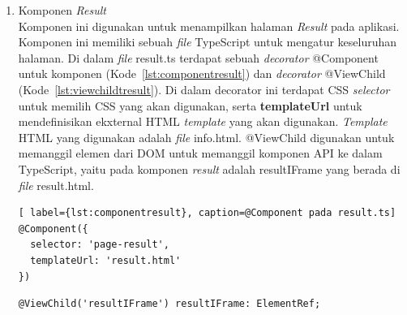 \begin{enumerate}
\begin{itemize}
		\item \textit{Content} \\
		\textit{Content} pada halaman info memiliki \textit{tag} \texttt{<ion-content>} (Kode~\ref{lst:contentInfo}) yang pada gambar~\ref{fig:InfoPageWireframe} dengan kotak berwarna merah. Di dalam \textit{tag} info terdapat \textit{tag} \texttt{<ion-grid>} untuk mengatur \textit{layout} dari \textit{content}. Di dalam \textit{tag} \texttt{<ion-grid>} terdapat sebuah \textit{tag} \texttt{<ion-row>} yang berisi sebuah \textit{tag} \texttt{<div>}. \textit{Tag} tersebut berisi info yang di dapatkan pada \textit{constructor} di \textit{file} info.ts.

\begin{lstlisting}[label={lst:contentInfo}, caption=\textit{Content} pada info.html]
<ion-content>
  <ion-grid>
    <ion-row>
      <div [innerHTML]=wsdcInfoData>
      </div>
    </ion-row>
  </ion-grid>
</ion-content>
\end{lstlisting} 
	\end{itemize}
	
	\item Komponen \textit{Result} \\
	Komponen ini digunakan untuk menampilkan halaman \textit{Result} pada aplikasi. Komponen ini memiliki sebuah \textit{file} TypeScript untuk mengatur keseluruhan halaman. Di dalam \textit{file} result.ts terdapat sebuah \textit{decorator} @Component untuk komponen (Kode~\ref{lst:componentresult}) dan \textit{decorator} @ViewChild (Kode~\ref{lst:viewchildtresult}). Di dalam decorator ini terdapat CSS \textit{selector} untuk memilih CSS yang akan digunakan, serta \textbf{templateUrl} untuk mendefinisikan ekxternal HTML \textit{template} yang akan digunakan. \textit{Template} HTML yang digunakan adalah \textit{file} info.html. @ViewChild digunakan untuk memanggil elemen dari DOM untuk memanggil komponen API ke dalam TypeScript, yaitu pada komponen \textit{result} adalah resultIFrame yang berada di \textit{file} result.html.
	
\begin{lstlisting}[ label={lst:componentresult}, caption=@Component pada result.ts]
@Component({
  selector: 'page-result',
  templateUrl: 'result.html'
})
\end{lstlisting} 

\begin{lstlisting}[label={lst:viewchildtresult}, caption=@ViewChild pada result.ts]
@ViewChild('resultIFrame') resultIFrame: ElementRef;
\end{lstlisting} 


\end{enumerate}
